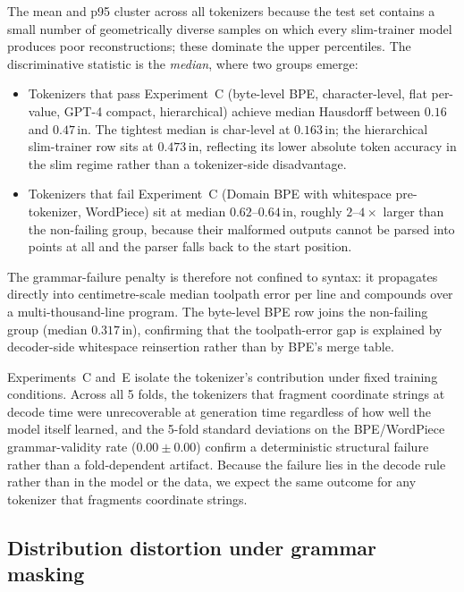 \documentclass[sensors,article,submit,moreauthors,pdftex]{Definitions/mdpi}
\begin{document}
The mean and p95 cluster across all tokenizers because the test set contains a small number of geometrically diverse samples on which every slim-trainer model produces poor reconstructions; these dominate the upper percentiles. The discriminative statistic is the \emph{median}, where two groups emerge:
\begin{itemize}[leftmargin=*, nosep]
    \item Tokenizers that pass Experiment~C (byte-level BPE, character-level, flat per-value, GPT-4 compact, hierarchical) achieve median Hausdorff between $0.16$ and $0.47$\,in. The tightest median is char-level at $0.163$\,in; the hierarchical slim-trainer row sits at $0.473$\,in, reflecting its lower absolute token accuracy in the slim regime rather than a tokenizer-side disadvantage.
    \item Tokenizers that fail Experiment~C (Domain BPE with whitespace pre-tokenizer, WordPiece) sit at median $0.62$--$0.64$\,in, roughly $2$--$4\times$ larger than the non-failing group, because their malformed outputs cannot be parsed into points at all and the parser falls back to the start position.
\end{itemize}
The grammar-failure penalty is therefore not confined to syntax: it propagates directly into centimetre-scale median toolpath error per line and compounds over a multi-thousand-line program. The byte-level BPE row joins the non-failing group (median $0.317$\,in), confirming that the toolpath-error gap is explained by decoder-side whitespace reinsertion rather than by BPE's merge table.

Experiments~C and~E isolate the tokenizer's contribution under fixed training conditions. Across all 5 folds, the tokenizers that fragment coordinate strings at decode time were unrecoverable at generation time regardless of how well the model itself learned, and the 5-fold standard deviations on the BPE/WordPiece grammar-validity rate ($0.00 \pm 0.00$) confirm a deterministic structural failure rather than a fold-dependent artifact. Because the failure lies in the decode rule rather than in the model or the data, we expect the same outcome for any tokenizer that fragments coordinate strings.

\subsection{Distribution distortion under grammar masking}
\label{sec:kl_measurement}
\end{document}
